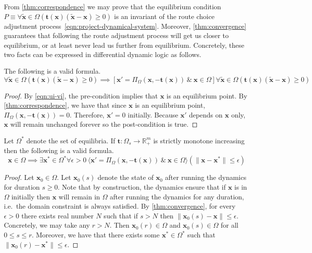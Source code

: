From \cref{thm:correspondence} we may prove that the equilibrium condition $P \equiv \forall \mathbf{\tilde{x}} \in \Omega (\mathbf{t}(\mathbf{x})(\mathbf{\tilde{x}}- \mathbf{x}) \geq 0)$ is an invariant of the route choice adjustment process~\eqref{eqn:project-dynamical-system}.
Moreover, \cref{thm:convergence} guarantees that following the route adjustment process will get us closer to equilibrium, or at least never lead us further from equilibrium.
Concretely, these two facts can be expressed in differential dynamic logic as follows.

\begin{theorem}
    The following is a valid formula.
    $$\forall \mathbf{\tilde{x}} \in \Omega (\mathbf{t}(\mathbf{x})(\mathbf{\tilde{x}}- \mathbf{x}) \geq 0) \implies [\mathbf{x}'=\Pi_{\Omega}(\mathbf{x}, -\mathbf{t}(\mathbf{x}))\ \&\ \mathbf{x}\in \Omega] \forall \mathbf{\tilde{x}} \in \Omega (\mathbf{t}(\mathbf{x})(\mathbf{\tilde{x}}- \mathbf{x}) \geq 0)$$
\end{theorem}

\begin{proof}
    By \eqref{eqn:ui-vi}, the pre-condition implies that $\mathbf{x}$ is an equilibrium point.
    By \cref{thm:correspondence}, we have that since $\mathbf{x}$ is an equilibrium point,  $\Pi_{\Omega}(\mathbf{x}, -\mathbf{t}(\mathbf{x})) = 0$.
    Therefore, $\mathbf{x}'=0$ initially. Because $\mathbf{x}'$ depends on $\mathbf{x}$ only, $\mathbf{x}$ will remain unchanged forever so the post-condition is true.
\end{proof}

\begin{theorem}
    \label{thm:dl:convergence}
    Let $\Omega^*$ denote the set of equilibria.
    If $\mathbf{t}: \Omega_s \to \mathbb{R}^m_+$ is strictly monotone increasing then the following is a valid formula.
    $$\mathbf{x} \in \Omega \implies \exists \mathbf{x}^*\in \Omega^* \forall \epsilon > 0\ \langle \mathbf{x}'=\Pi_{\Omega}(\mathbf{x}, -\mathbf{t}(\mathbf{x}))\ \&\ \mathbf{x}\in \Omega\rangle ( \|\mathbf{x} - \mathbf{x}^*\| \leq \epsilon)$$
\end{theorem}

\begin{proof}
    Let $\mathbf{x}_0 \in \Omega$. Let $\mathbf{x}_0(s)$ denote the state of $\mathbf{x}_0$ after running the dynamics for duration $s\geq 0$.
    Note that by construction, the dynamics ensure that if $\mathbf{x}$ is in $\Omega$ initially then $\mathbf{x}$ will remain in $\Omega$ after running the dynamics for any duration, i.e.\ the domain constraint is always satisfied.
    By \cref{thm:convergence}, for every $\epsilon > 0$ there exists real number $N$ such that if $s > N$ then $\|\mathbf{x}_0(s) - \mathbf{x}\| \leq \epsilon$. 
    Concretely, we may take any $r > N$.
    Then $\mathbf{x}_0(r) \in \Omega$ and $\mathbf{x}_0(s) \in \Omega$ for all $0 \leq s \leq r$.
    Moreover, we have that there exists some $\mathbf{x}^*\in \Omega^*$  such that $\|\mathbf{x}_0(r) - \mathbf{x}^*\| \leq \epsilon$.
\end{proof}
